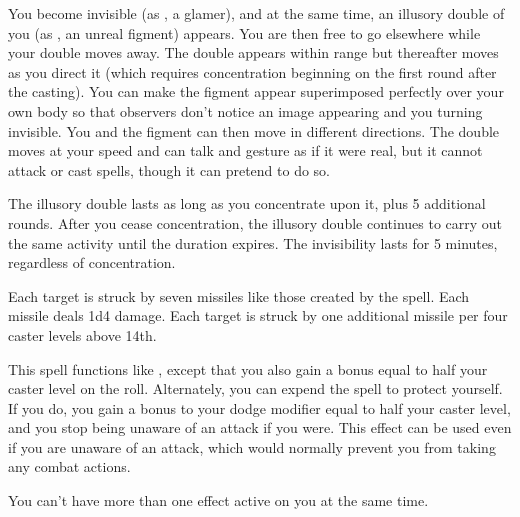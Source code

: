 \begin{spelleffect}
  You become invisible (as , a glamer), and at the same time, an illusory double of you (as , an unreal figment) appears. You are then free to go elsewhere while your double moves away. The double appears within range but thereafter moves as you direct it (which requires concentration beginning on the first round after the casting). You can make the figment appear superimposed perfectly over your own body so that observers don't notice an image appearing and you turning invisible. You and the figment can then move in different directions. The double moves at your speed and can talk and gesture as if it were real, but it cannot attack or cast spells, though it can pretend to do so.
  \par The illusory double lasts as long as you concentrate upon it, plus 5 additional rounds. After you cease concentration, the illusory double continues to carry out the same activity until the duration expires. The invisibility lasts for 5 minutes, regardless of concentration.
\end{spelleffect}

\begin{spelleffect}
    Each target is struck by seven missiles like those created by the  spell. Each missile deals 1d4 damage. Each target is struck by one additional missile per four caster levels above 14th.
\end{spelleffect}

\begin{spelleffect}
  This spell functions like , except that you also gain a bonus equal to half your caster level on the roll. Alternately, you can expend the spell to protect yourself. If you do, you gain a bonus to your dodge modifier equal to half your caster level, and you stop being unaware of an attack if you were. This effect can be used even if you are unaware of an attack, which would normally prevent you from taking any combat actions.
\end{spelleffect}
\begin{spellnotes}
  You can't have more than one  effect active on you at the same time.
\end{spellnotes}

